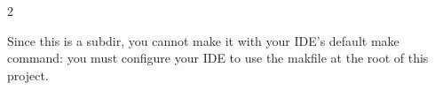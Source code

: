 \documentclass[12pt]{article}
\begin{document}
2

Since this is a subdir, you cannot make it with your IDE's default make command:
you must configure your IDE to use the makfile at the root of this project.
\end{document}
